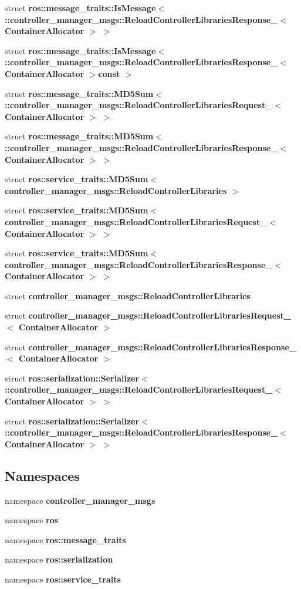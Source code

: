 \begin{DoxyCompactItemize}
\item 
struct {\bf ros\-::message\-\_\-traits\-::\-Is\-Message$<$ \-::controller\-\_\-manager\-\_\-msgs\-::\-Reload\-Controller\-Libraries\-Response\-\_\-$<$ Container\-Allocator $>$ $>$}
\item 
struct {\bf ros\-::message\-\_\-traits\-::\-Is\-Message$<$ \-::controller\-\_\-manager\-\_\-msgs\-::\-Reload\-Controller\-Libraries\-Response\-\_\-$<$ Container\-Allocator $>$const  $>$}
\item 
struct {\bf ros\-::message\-\_\-traits\-::\-M\-D5\-Sum$<$ \-::controller\-\_\-manager\-\_\-msgs\-::\-Reload\-Controller\-Libraries\-Request\-\_\-$<$ Container\-Allocator $>$ $>$}
\item 
struct {\bf ros\-::message\-\_\-traits\-::\-M\-D5\-Sum$<$ \-::controller\-\_\-manager\-\_\-msgs\-::\-Reload\-Controller\-Libraries\-Response\-\_\-$<$ Container\-Allocator $>$ $>$}
\item 
struct {\bf ros\-::service\-\_\-traits\-::\-M\-D5\-Sum$<$ controller\-\_\-manager\-\_\-msgs\-::\-Reload\-Controller\-Libraries $>$}
\item 
struct {\bf ros\-::service\-\_\-traits\-::\-M\-D5\-Sum$<$ controller\-\_\-manager\-\_\-msgs\-::\-Reload\-Controller\-Libraries\-Request\-\_\-$<$ Container\-Allocator $>$ $>$}
\item 
struct {\bf ros\-::service\-\_\-traits\-::\-M\-D5\-Sum$<$ controller\-\_\-manager\-\_\-msgs\-::\-Reload\-Controller\-Libraries\-Response\-\_\-$<$ Container\-Allocator $>$ $>$}
\item 
struct {\bf controller\-\_\-manager\-\_\-msgs\-::\-Reload\-Controller\-Libraries}
\item 
struct {\bf controller\-\_\-manager\-\_\-msgs\-::\-Reload\-Controller\-Libraries\-Request\-\_\-$<$ Container\-Allocator $>$}
\item 
struct {\bf controller\-\_\-manager\-\_\-msgs\-::\-Reload\-Controller\-Libraries\-Response\-\_\-$<$ Container\-Allocator $>$}
\item 
struct {\bf ros\-::serialization\-::\-Serializer$<$ \-::controller\-\_\-manager\-\_\-msgs\-::\-Reload\-Controller\-Libraries\-Request\-\_\-$<$ Container\-Allocator $>$ $>$}
\item 
struct {\bf ros\-::serialization\-::\-Serializer$<$ \-::controller\-\_\-manager\-\_\-msgs\-::\-Reload\-Controller\-Libraries\-Response\-\_\-$<$ Container\-Allocator $>$ $>$}
\end{DoxyCompactItemize}
\subsection*{\-Namespaces}
\begin{DoxyCompactItemize}
\item 
namespace {\bf controller\-\_\-manager\-\_\-msgs}
\item 
namespace {\bf ros}
\item 
namespace {\bf ros\-::message\-\_\-traits}
\item 
namespace {\bf ros\-::serialization}
\item 
namespace {\bf ros\-::service\-\_\-traits}
\end{DoxyCompactItemize}
